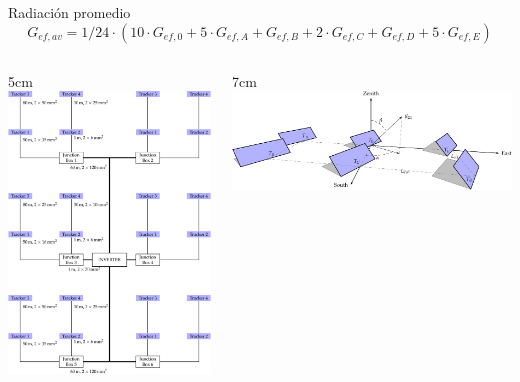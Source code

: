 \documentclass[xcolor={usenames,svgnames,dvipsnames}]{beamer}
\begin{document}
\begin{frame}[label=sec-2-5-3]{Radiación promedio}
$$G_{ef, av} = 1/24 \cdot \left( 10 \cdot G_{ef,0} + 5 \cdot G_{ef,A} + G_{ef,B} + 2 \cdot G_{ef,C} + G_{ef,D} + 5 \cdot G_{ef,E} \right)$$

\begin{columns}
\begin{column}{5cm\textwidth}
\includegraphics[width=.9\linewidth]{../figs/plantConfiguration.pdf}
\end{column}

\begin{column}{7cm\textwidth}
\includegraphics[width=.9\linewidth]{../figs/6trackers.pdf}
\end{column}
\end{columns}
\end{frame}
\end{document}
